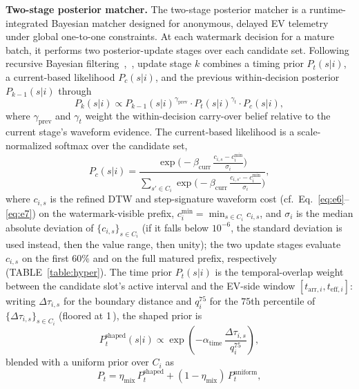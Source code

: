 \documentclass{ieeeaccess}
\begin{document}
    \textbf{Two-stage posterior matcher.}
    The two-stage posterior matcher is a runtime-integrated Bayesian matcher designed for anonymous, delayed EV telemetry under global one-to-one constraints.
    At each watermark decision for a mature batch, it performs two posterior-update stages over each candidate set.
    Following recursive Bayesian filtering~\cite{b19},~\cite{bsarkka}, update stage $k$ combines a timing prior $P_t(s|i)$, a current-based likelihood $P_c(s|i)$, and the previous within-decision posterior $P_{k-1}(s|i)$ through
    \begin{equation}\label{eq:e10}
        P_k(s|i) \propto P_{k-1}(s|i)^{\gamma_{\text{prev}}} \cdot P_t(s|i)^{\gamma_t} \cdot P_c(s|i),
    \end{equation}
    where $\gamma_{\text{prev}}$ and $\gamma_t$ weight the within-decision carry-over belief relative to the current stage's waveform evidence.
    The current-based likelihood is a scale-normalized softmax over the candidate set,
    \begin{equation}\label{eq:pc}
        P_c(s|i) = \frac{\exp\!\big(-\beta_{\text{curr}}\,\frac{c_{i,s}-c_i^{\min}}{\sigma_i}\big)}{\sum_{s'\in C_i}\exp\!\big(-\beta_{\text{curr}}\,\frac{c_{i,s'}-c_i^{\min}}{\sigma_i}\big)},
    \end{equation}
    where $c_{i,s}$ is the refined DTW and step-signature waveform cost (cf.\ Eq.~\eqref{eq:e6}--\eqref{eq:e7}) on the watermark-visible prefix, $c_i^{\min}=\min_{s\in C_i}c_{i,s}$, and $\sigma_i$ is the median absolute deviation of $\{c_{i,s}\}_{s\in C_i}$ (if it falls below $10^{-6}$, the standard deviation is used instead, then the value range, then unity); the two update stages evaluate $c_{i,s}$ on the first $60\%$ and on the full matured prefix, respectively (TABLE~\ref{table:hyper}).
    The time prior $P_t(s|i)$ is the temporal-overlap weight between the candidate slot's active interval and the EV-side window $[t_{\text{arr},i}, t_{\text{eff},i}]$: writing $\Delta\tau_{i,s}$ for the boundary distance and $q^{75}_i$ for the $75$th percentile of $\{\Delta\tau_{i,s}\}_{s\in C_i}$ (floored at 1\,), the shaped prior is
    \begin{equation}\label{eq:shaped}
        P_t^{\text{shaped}}(s|i)\propto\exp\!\left(-\alpha_{\text{time}}\,\frac{\Delta\tau_{i,s}}{q^{75}_i}\right),
    \end{equation}
    blended with a uniform prior over $C_i$ as
    \begin{equation}\label{eq:ptblend}
        P_t = \eta_{\text{mix}}\,P_t^{\text{shaped}} + (1-\eta_{\text{mix}})\,P_t^{\text{uniform}},
    \end{equation}
\end{document}

